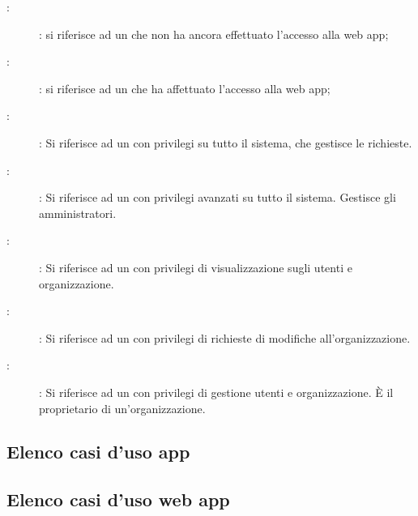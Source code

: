 \documentclass[../analisi-dei-requisiti]{subfiles}
\begin{document}
\begin{description}
  \item[:]: si riferisce ad un  che non ha ancora effettuato l'accesso alla web app;
  \item[:]: si riferisce ad un  che ha affettuato l'accesso alla web app;
  \item[:]: Si riferisce ad un  con privilegi su tutto il sistema, che gestisce le richieste.
  \item[:]: Si riferisce ad un  con privilegi avanzati su tutto il sistema. Gestisce gli amministratori.
  \item[:]: Si riferisce ad un  con privilegi di visualizzazione sugli utenti e organizzazione.
  \item[:]: Si riferisce ad un  con privilegi di richieste di modifiche all'organizzazione.
  \item[:]: Si riferisce ad un  con privilegi di gestione utenti e organizzazione. È il proprietario di un'organizzazione.
\end{description}


\subsection{Elenco casi d'uso app}%
\label{sub:casi_duso_app}

\subsection{Elenco casi d'uso web app}%
\label{sub:casi_duso_web_app}

\end{document}
